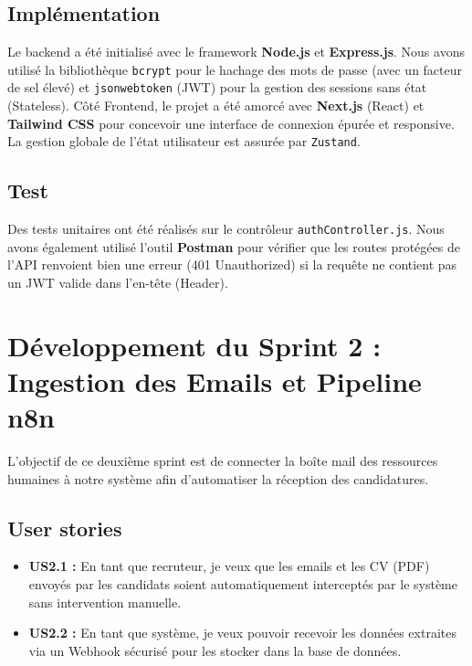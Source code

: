 \subsection{Implémentation}
Le backend a été initialisé avec le framework \textbf{Node.js} et \textbf{Express.js}. Nous avons utilisé la bibliothèque \texttt{bcrypt} pour le hachage des mots de passe (avec un facteur de sel élevé) et \texttt{jsonwebtoken} (JWT) pour la gestion des sessions sans état (Stateless). 
Côté Frontend, le projet a été amorcé avec \textbf{Next.js} (React) et \textbf{Tailwind CSS} pour concevoir une interface de connexion épurée et responsive. La gestion globale de l'état utilisateur est assurée par \texttt{Zustand}.


\subsection{Test}
Des tests unitaires ont été réalisés sur le contrôleur \texttt{authController.js}. Nous avons également utilisé l'outil \textbf{Postman} pour vérifier que les routes protégées de l'API renvoient bien une erreur (401 Unauthorized) si la requête ne contient pas un JWT valide dans l'en-tête (Header).

\section{Développement du Sprint 2 : Ingestion des Emails et Pipeline n8n}
L'objectif de ce deuxième sprint est de connecter la boîte mail des ressources humaines à notre système afin d'automatiser la réception des candidatures.

\subsection{User stories}
\begin{itemize}
    \item \textbf{US2.1 :} En tant que recruteur, je veux que les emails et les CV (PDF) envoyés par les candidats soient automatiquement interceptés par le système sans intervention manuelle.
    \item \textbf{US2.2 :} En tant que système, je veux pouvoir recevoir les données extraites via un Webhook sécurisé pour les stocker dans la base de données.
\end{itemize}

